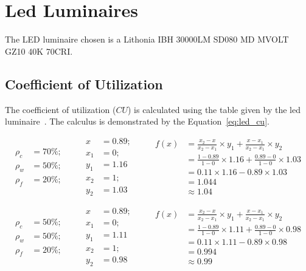 \chapter{Led Luminaires}

The LED luminaire chosen is a Lithonia IBH 30000LM SD080 MD MVOLT GZ10 40K 70CRI.

\section{Coefficient of Utilization}
The coefficient of utilization ($CU$) is calculated using the table given by the led luminaire~\cite{www:led_photometric}. The calculus is demonstrated by the Equation~\ref{eq:led_cu}.

\begin{equation*}
\begin{split}
\rho_c &= 70\%; \\
\rho_w &= 50\%; \\
\rho_f &= 20\%;
\end{split}
\qquad
\begin{split}
x &= 0.89; \\
x_1 &= 0; \\ y_1 &= 1.16 \\
x_2 &= 1; \\ y_2 &= 1.03
\end{split}
\qquad
\begin{split}
f(x) &= \frac{x_2 - x}{x_2 - x_1} \times y_1 +
       \frac{x - x_1}{x_2 - x_1} \times y_2 \\
 &= \frac{1 - 0.89}{1 - 0} \times 1.16 +
    \frac{0.89 - 0}{1 - 0} \times 1.03 \\
 & = 0.11 \times 1.16 - 0.89 \times 1.03 \\
 & = 1.044 \\
 & \approx 1.04
\end{split}
\label{eq:led_cu_interpol_1}
\end{equation*}

\begin{equation*}
\begin{split}
\rho_c &= 50\%; \\
\rho_w &= 50\%; \\
\rho_f &= 20\%;
\end{split}
\qquad
\begin{split}
x &= 0.89; \\
x_1 &= 0; \\ y_1 &= 1.11 \\
x_2 &= 1; \\ y_2 &= 0.98
\end{split}
\qquad
\begin{split}
f(x) &= \frac{x_2 - x}{x_2 - x_1} \times y_1 +
       \frac{x - x_1}{x_2 - x_1} \times y_2 \\
 &= \frac{1 - 0.89}{1 - 0} \times 1.11 +
    \frac{0.89 - 0}{1 - 0} \times 0.98 \\
 & = 0.11 \times 1.11 - 0.89 \times 0.98 \\
 & = 0.994 \\
 & \approx 0.99
\end{split}
\label{eq:led_cu_interpol_2}
\end{equation*}

